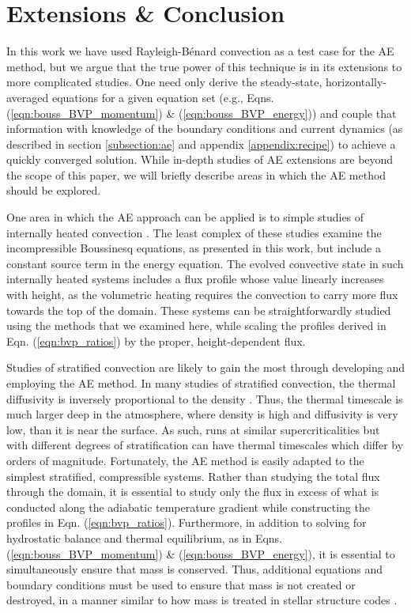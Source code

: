 \documentclass[aps, pre, onecolumn, nofootinbib, notitlepage, groupedaddress, amsfonts, amssymb, amsmath, longbibliography]{revtex4-1}
\newcommand{\RB}{Rayleigh-B\'{e}nard }
\begin{document}


\section{Extensions \& Conclusion}
\label{sec:extensions}
In this work we have used \RB convection as a test case for the AE method, but we argue that
the true power of this technique is in its extensions to more complicated studies.
One need only derive the steady-state, horizontally-averaged equations for a given
equation set (e.g., Eqns. (\ref{eqn:bouss_BVP_momentum}) \& (\ref{eqn:bouss_BVP_energy}))
and couple that information with knowledge of the boundary conditions
and current dynamics (as described in
section \ref{subsection:ae} and appendix \ref{appendix:recipe}) to achieve a quickly
converged solution. While in-depth studies of AE extensions are beyond the 
scope of this paper, we will briefly describe
areas in which the AE method should be explored.

One area in which the AE approach can be applied is to simple studies of
internally heated convection \cite{goluskin2016}.  The least complex of these studies 
examine the incompressible Boussinesq equations, as presented in this work,
but include a constant source term in the energy equation. The evolved convective
state in such internally heated systems includes a flux profile whose value linearly
increases with height, as the volumetric heating requires the convection to carry
more flux towards the top of the domain.  These systems can be straightforwardly
studied using the methods that we examined here, while scaling the profiles derived
in Eqn. (\ref{eqn:bvp_ratios}) by the proper, height-dependent flux.

Studies of stratified convection are likely to gain the most through
developing and employing the AE method.
In many studies of stratified convection, the thermal diffusivity
is inversely proportional to the density \cite{anders&brown2017}. Thus, the
thermal timescale is much larger deep in the atmosphere, where density is high and diffusivity
is very low, than it is near the surface.  As such, runs at similar supercriticalities
but with different degrees of stratification can have thermal timescales which
differ by orders of magnitude.  Fortunately, the AE method is easily adapted to
the simplest stratified, compressible systems.  Rather than studying the total
flux through the domain, it is essential to study only the flux in excess of 
what is conducted along the adiabatic temperature gradient while constructing
the profiles in Eqn. (\ref{eqn:bvp_ratios}).  
Furthermore, in addition to solving for
hydrostatic balance and thermal equilibrium, as in Eqns. (\ref{eqn:bouss_BVP_momentum})
\& (\ref{eqn:bouss_BVP_energy}), it is essential to simultaneously
ensure that mass is conserved.  Thus, additional equations and boundary conditions
must be used to ensure that mass is not created or destroyed,
in a manner similar to how mass is treated in stellar structure codes
\cite{paxton&all2011}.
\end{document}

